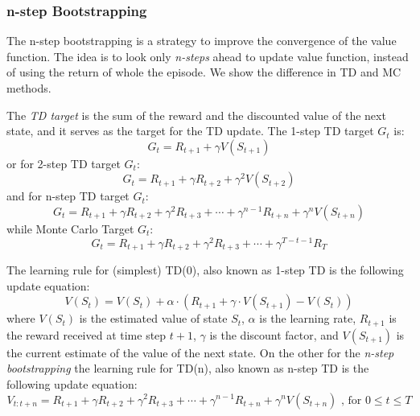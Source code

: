 \documentclass[../xlapes02]{subfiles}
\begin{document}
    \subsubsection{n-step Bootstrapping}\label{subsubsec:n-step-bootstrapping}
    The n-step bootstrapping is a strategy to improve the convergence of the value function. The idea is to look only \emph{n-steps} ahead to update value function, instead of using the return of whole the episode. We show the difference in TD and MC methods.

    The \emph{TD target} is the sum of the reward and the discounted value of the next state, and it serves as the target for the TD update. The 1-step TD target $G_t$ is:
    \begin{equation}
        G_t=R_{t+1}+\gamma V(S_{t+1})
    \end{equation}
    or for 2-step TD target $G_t$:
    \begin{equation}
        G_t=R_{t+1}+\gamma R_{t+2}+\gamma^2V(S_{t+2})
    \end{equation}
    and for n-step TD target $G_t$:
    \begin{equation}
        G_t=R_{t+1}+\gamma R_{t+2}+\gamma^2R_{t+3}+\cdots+\gamma^{n-1}R_{t+n}+\gamma^nV(S_{t+n})
    \end{equation}
    while Monte Carlo Target $G_t$:
    \begin{equation}
        G_t=R_{t+1}+\gamma R_{t+2}+\gamma^2R_{t+3}+\cdots+\gamma^{T-t-1}R_{T}
    \end{equation}
%

    The learning rule for (simplest) TD(0), also known as 1-step TD is the following update equation:
    \begin{equation}
        V(S_t)=V(S_t)+\alpha\cdot(R_{t+1}+\gamma\cdot V(S_{t+1})-V(S_t))
    \end{equation}
    where $ V(S_t) $ is the estimated value of state $ S_t $, $ \alpha $ is the learning rate, $ R_{t+1} $ is the reward received at time step $ t+1 $, $ \gamma $ is the discount factor, and $ V(S_{t+1}) $ is the current estimate of the value of the next state. On the other for the \emph{n-step bootstrapping} the learning rule for TD(n), also known as n-step TD is the following update equation:
    \begin{equation}
        V_{t:t+n}=R_{t+1}+\gamma R_{t+2}+\gamma^2R_{t+3}+\cdots+\gamma^{n-1}R_{t+n}+\gamma^nV(S_{t+n})\text{ , for }0\leq t\leq T
    \end{equation}
\end{document}
